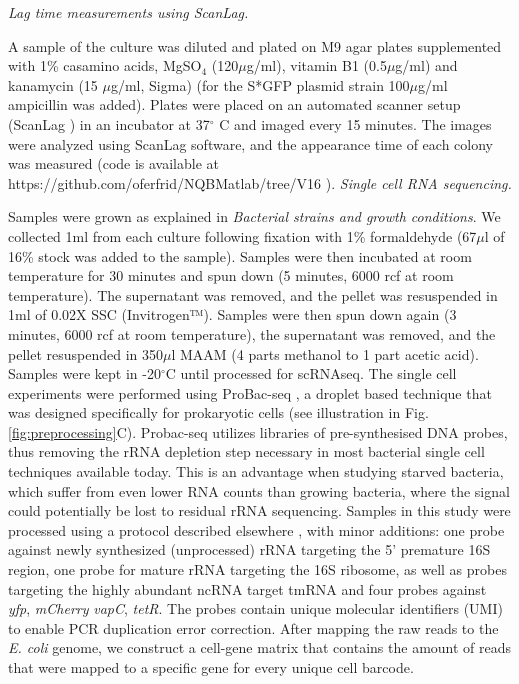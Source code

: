 \documentclass[12pt]{article}
\begin{document}
\vspace{0.5cm}
\newline
\textit{Lag time measurements using ScanLag.}\par
A sample of the culture was diluted and plated on M9 agar plates supplemented with 1\% casamino acids, MgSO$_4$ (120$\mu$g/ml), vitamin B1 (0.5$\mu$g/ml) and kanamycin (15 $\mu$g/ml, Sigma) (for the S*GFP plasmid strain 100$\mu$g/ml ampicillin was added). Plates were placed on an automated scanner setup (ScanLag \cite{Levin-Reisman2010}) in an incubator at 37$^\circ$ C and imaged every 15 minutes. The images were analyzed using ScanLag software, and the appearance time of each colony was measured (code is available at https://github.com/oferfrid/NQBMatlab/tree/V16 ).
\vspace{0.5cm}
\newline
\textit{Single cell RNA sequencing.}\par
Samples were grown as explained in \textit{Bacterial strains and growth conditions}. We collected 1ml from each culture following fixation with 1\% formaldehyde (67$\mu$l of 16\% stock was added to the sample). Samples were then incubated at room temperature for 30 minutes and spun down (5 minutes, 6000 rcf at room temperature). The supernatant was removed, and the pellet was resuspended in 1ml of 0.02X SSC (Invitrogen™). Samples were then spun down again (3 minutes, 6000 rcf at room temperature), the supernatant was removed, and the pellet resuspended in 350$\mu$l MAAM (4 parts methanol to 1 part acetic acid). Samples were kept in -20$^\circ$C until processed for scRNAseq. 
The single cell experiments were performed using ProBac-seq \cite{McNulty2023}, a droplet based technique that was designed specifically for prokaryotic cells (see illustration in Fig. \ref{fig:preprocessing}C). Probac-seq utilizes libraries of pre-synthesised DNA probes, thus removing the rRNA depletion step necessary in most bacterial single cell techniques available today. This is an advantage when studying starved bacteria, which suffer from even lower RNA counts than growing bacteria, where the signal could potentially be lost to residual rRNA sequencing. Samples in this study were processed using a protocol described elsewhere \cite{McNulty2023,Samanta2024}, with minor additions: one probe against newly synthesized (unprocessed) rRNA targeting the 5' premature 16S region, one probe for mature rRNA targeting the 16S ribosome, as well as probes targeting the highly abundant ncRNA target tmRNA and four probes against \textit{yfp}, \textit{mCherry }\textit{vapC}, \textit{tetR}. The probes contain unique molecular identifiers (UMI) to enable PCR duplication error correction. After mapping the raw reads to the \textit{E. coli} genome, we construct a cell-gene matrix that contains the amount of reads that were mapped to a specific gene for every unique cell barcode.
\end{document}
